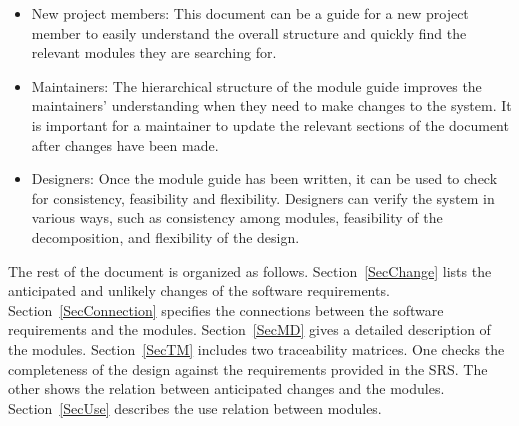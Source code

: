 \documentclass[12pt, titlepage]{article}
\begin{document}
\begin{itemize}
\item New project members: This document can be a guide for a new project member
  to easily understand the overall structure and quickly find the
  relevant modules they are searching for.
\item Maintainers: The hierarchical structure of the module guide improves the
  maintainers' understanding when they need to make changes to the system. It is
  important for a maintainer to update the relevant sections of the document
  after changes have been made.
\item Designers: Once the module guide has been written, it can be used to
  check for consistency, feasibility and flexibility. Designers can verify the
  system in various ways, such as consistency among modules, feasibility of the
  decomposition, and flexibility of the design.
\end{itemize}

The rest of the document is organized as follows. Section~\ref{SecChange} lists
the anticipated and unlikely changes of the software requirements. 
Section~\ref{SecConnection}
specifies the connections between the software requirements and the
modules. Section~\ref{SecMD} gives a detailed description of the
modules. Section~\ref{SecTM} includes two traceability matrices. One checks the
completeness of the design against the requirements provided in the SRS. The
other shows the relation between anticipated changes and the modules. 
Section~\ref{SecUse} describes the use relation between modules.
\end{document}
